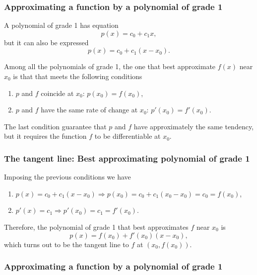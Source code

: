 \begin{frame}
\frametitle{Approximating a function by a polynomial of grade 1}
A polynomial of grade 1 has equation
\[
p(x) = c_0+c_1x,
\]
but it can also be expressed 
\[
p(x) = c_0+c_1(x-x_0).
\]

Among all the polynomials of grade 1, the one that best approximate $f(x)$ near $x_0$ is that that meets the following conditions

\begin{enumerate}
\item $p$ and $f$ coincide at $x_0$: $p(x_0) = f(x_0)$,
\item $p$ and $f$ have the same rate of change at $x_0$: $p'(x_0) = f'(x_0)$.
\end{enumerate}

The last condition guarantee that $p$ and $f$ have approximately the same tendency, but it requires the function $f$ to be differentiable at $x_0$.
\end{frame}


\begin{frame}
\frametitle{The tangent line: Best approximating polynomial of grade 1}
Imposing the previous conditions we have
\begin{enumerate}
\item $p(x)=c_0+c_1(x-x_0) \Rightarrow p(x_0)=c_0+c_1(x_0-x_0)=c_0=f(x_0)$,
\item $p'(x)=c_1 \Rightarrow p'(x_0)=c_1=f'(x_0)$.
\end{enumerate}

Therefore, the polynomial of grade 1 that best approximates $f$ near $x_0$ is
\[
p(x) = f(x_0)+f '(x_0)(x-x_0),
\]
which turns out to be the tangent line to $f$ at $(x_0,f(x_0))$.
\end{frame}


\begin{frame}
\frametitle{Approximating a function by a polynomial of grade 1}
\begin{center}

\end{center}
\end{frame}


